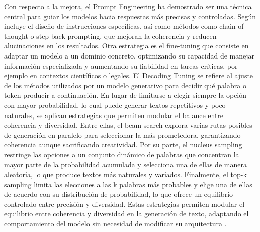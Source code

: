 Con respecto a la mejora, el Prompt Engineering ha demostrado ser una técnica central para guiar los modelos hacia respuestas más precisas y controladas. Según \textcite{zhang2025hallucination}
incluye el diseño de instrucciones específicas, así como métodos como chain of thought o step-back prompting, que mejoran la coherencia y reducen alucinaciones en los resultados.
Otra estrategia es el fine-tuning que consiste en adaptar un modelo a un dominio concreto, optimizando su capacidad de manejar información especializada y aumentando su fiabilidad en tareas críticas,
por ejemplo en contextos científicos o legales.  
El Decoding Tuning se refiere al ajuste de los métodos utilizados por un modelo generativo para decidir qué palabra o token producir a continuación. 
En lugar de limitarse a elegir siempre la opción con mayor probabilidad, lo cual puede generar textos repetitivos y poco naturales, se aplican estrategias 
que permiten modular el balance entre coherencia y diversidad. Entre ellas, el beam search explora varias rutas posibles de generación en paralelo para seleccionar 
la más prometedora, garantizando coherencia aunque sacrificando creatividad. Por su parte, el nucleus sampling restringe las opciones a un conjunto dinámico de palabras 
que concentran la mayor parte de la probabilidad acumulada y selecciona una de ellas de manera aleatoria, lo que produce textos más naturales y variados. Finalmente, 
el top-k sampling limita las elecciones a las k palabras más probables y elige una de ellas de acuerdo con su distribución de probabilidad, lo que ofrece un equilibrio 
controlado entre precisión y diversidad. Estas estrategias permiten modular el equilibrio entre coherencia y diversidad en la generación de texto, 
adaptando el comportamiento del modelo sin necesidad de modificar su arquitectura \parencite{hu2024ragrau}.



